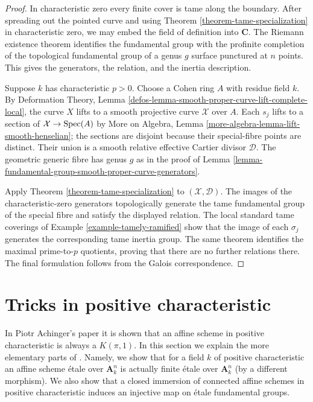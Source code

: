 \begin{proof}
In characteristic zero every finite cover is tame along the boundary.
After spreading out the pointed curve and using
Theorem \ref{theorem-tame-specialization} in characteristic zero, we may
embed the field of definition into $\mathbf{C}$. The Riemann existence
theorem \cite[Expos\'e XII, Corollaire 5.2]{SGA1} identifies the fundamental
group with the profinite completion of the topological fundamental group of
a genus $g$ surface punctured at $n$ points. This gives the generators, the
relation, and the inertia description.

Suppose $k$ has characteristic $p > 0$. Choose a Cohen ring $A$ with residue
field $k$. By Deformation Theory, Lemma
\ref{defos-lemma-smooth-proper-curve-lift-complete-local}, the curve $X$
lifts to a smooth projective curve $\mathcal{X}$ over $A$. Each $s_j$ lifts
to a section of $\mathcal{X} \to \mathop{\mathrm{Spec}}(A)$ by More on Algebra, Lemma
\ref{more-algebra-lemma-lift-smooth-henselian}; the sections are disjoint
because their special-fibre points are distinct. Their union is a smooth
relative effective Cartier divisor $\mathcal{D}$. The geometric generic
fibre has genus $g$ as in the proof of
Lemma \ref{lemma-fundamental-group-smooth-proper-curve-generators}.

Apply Theorem \ref{theorem-tame-specialization} to
$(\mathcal{X}, \mathcal{D})$. The images of the characteristic-zero
generators topologically generate the tame fundamental group of the special
fibre and satisfy the displayed relation. The local standard tame coverings
of Example \ref{example-tamely-ramified} show that the image of each
$\sigma_j$ generates the corresponding tame inertia group. The same theorem
identifies the maximal prime-to-$p$ quotients, proving that there are no
further relations there. The final formulation follows from the Galois
correspondence.
\end{proof}











\section{Tricks in positive characteristic}
\label{section-achinger}

\noindent
In Piotr Achinger's paper \cite{Achinger} it is shown that an
affine scheme in positive characteristic is always a $K(\pi, 1)$.
In this section we explain the more elementary parts of \cite{Achinger}.
Namely, we show that for a field $k$ of positive characteristic
an affine scheme \'etale over $\mathbf{A}^n_k$ is actually finite \'etale
over $\mathbf{A}^n_k$ (by a different morphism). We also show
that a closed immersion of connected affine schemes
in positive characteristic induces an injective map on
\'etale fundamental groups.

